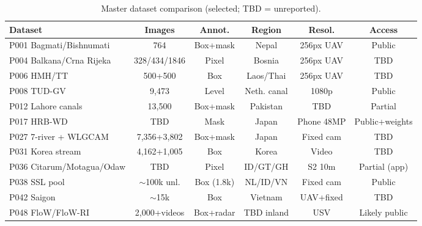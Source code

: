 \begin{table}[!t]
\centering
\caption{Master dataset comparison (selected; TBD = unreported).}
\label{tab:datasets}
\begin{tabular}{lccccc}
\hline
\textbf{Dataset} & \textbf{Images} & \textbf{Annot.} & \textbf{Region} & \textbf{Resol.} & \textbf{Access} \\
\hline
P001 Bagmati/Bishnumati & 764 & Box+mask & Nepal & 256px UAV & Public \\
P004 Balkana/Crna Rijeka & 328/434/1846 & Pixel & Bosnia & 256px UAV & TBD \\
P006 HMH/TT & 500+500 & Box & Laos/Thai & 256px UAV & TBD \\
P008 TUD-GV & 9,473 & Level & Neth. canal & 1080p & Public \\
P012 Lahore canals & 13,500 & Box+mask & Pakistan & TBD & Partial \\
P017 HRB-WD & TBD & Mask & Japan & Phone 48MP & Public+weights \\
P027 7-river + WLGCAM & 7,356+3,802 & Box+mask & Japan & Fixed cam & TBD \\
P031 Korea stream & 4,162+1,005 & Box & Korea & Video & TBD \\
P036 Citarum/Motagua/Odaw & TBD & Pixel & ID/GT/GH & S2 10m & Partial (app) \\
P038 SSL pool & $\sim$100k unl. & Box (1.8k) & NL/ID/VN & Fixed cam & Public \\
P042 Saigon & $\sim$15k & Box & Vietnam & UAV+fixed & TBD \\
P048 FloW/FloW-RI & 2,000+videos & Box+radar & TBD inland & USV & Likely public \\
\hline
\end{tabular}
\end{table}
